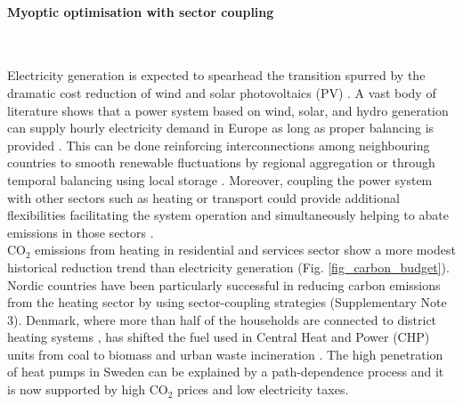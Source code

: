 \documentclass[5p]{elsarticle} %
\begin{document}
\FloatBarrier

\paragraph{\textbf{Myoptic optimisation with sector coupling}} \

Electricity generation is expected to spearhead the transition spurred by the dramatic cost reduction of wind \cite{Lantz_2012} and solar photovoltaics (PV) \cite{Creutzig_2017, Haegel_2019}. A vast body of literature shows that a power system based on wind, solar, and hydro generation can supply hourly electricity demand in Europe as long as proper balancing is provided \cite{Eriksen_2017, Schlachtberger_2017, Gils_2017a, Brown_response}. This can be done reinforcing interconnections among neighbouring countries \cite{Rodriguez_2014} to smooth renewable fluctuations by regional aggregation or through temporal balancing using local storage \cite{Rasmussen_2012, Cebulla_2017, Victoria_2019_storage}. Moreover, coupling the power system with other sectors such as heating or transport could provide additional flexibilities facilitating the system operation and simultaneously helping to abate emissions in those sectors \cite{Connolly_2016, Brown_2018, Child_2019}. \\

CO$_2$ emissions from heating in residential and services sector show a more modest historical reduction trend than electricity generation (Fig. \ref{fig_carbon_budget}). Nordic countries have been particularly successful in reducing carbon emissions from the heating sector by using sector-coupling strategies (Supplementary Note 3). Denmark, where more than half of the households are connected to district heating systems \cite{Gross_2019}, has shifted the fuel used in Central Heat and Power (CHP) units from coal to biomass and urban waste incineration \cite{DEA_2015}. The high penetration of heat pumps in Sweden can be explained by a path-dependence process \cite{Gross_2019} and it is now supported by high CO$_2$ prices \cite{Carbon_pricing_2019} and low electricity taxes.\\ 
\end{document}
